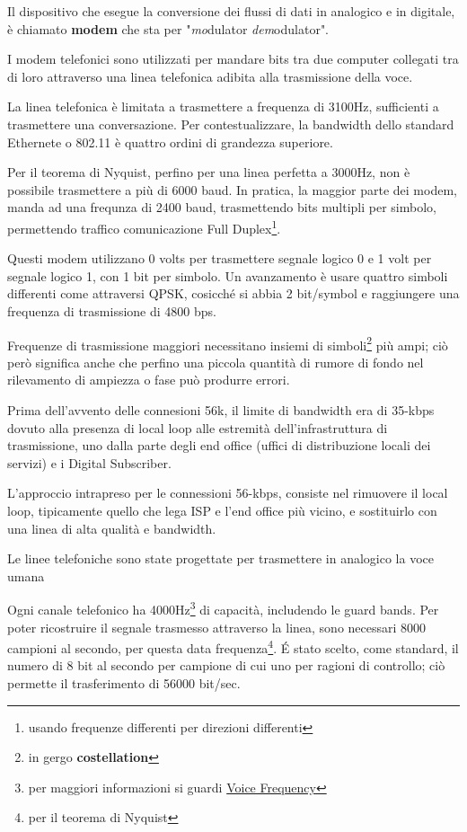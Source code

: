 \documentclass[../ComputerNetworks.tex]{subfiles}
\begin{document}
Il dispositivo che esegue la conversione dei flussi di dati in analogico e in digitale, è chiamato \textbf{modem} che sta per "\emph{mo}dulator \emph{dem}odulator".

I modem telefonici sono utilizzati per mandare bits tra due computer collegati tra di loro attraverso una linea telefonica adibita alla trasmissione della voce.

La linea telefonica è limitata a trasmettere a frequenza di 3100Hz, sufficienti a trasmettere una conversazione.
Per contestualizzare, la bandwidth dello standard Ethernete o 802.11 è quattro ordini di grandezza superiore.

Per il teorema di Nyquist, perfino per una linea perfetta a 3000Hz, non è possibile trasmettere a più di 6000 baud.
In pratica, la maggior parte dei modem, manda ad una frequnza di 2400 baud, trasmettendo bits multipli per simbolo, permettendo traffico comunicazione Full Duplex\footnote{usando frequenze differenti per direzioni differenti}.

Questi modem utilizzano 0 volts per trasmettere segnale logico 0 e 1 volt per segnale logico 1, con 1 bit per simbolo.
Un avanzamento è usare quattro simboli differenti come attraversi QPSK, cosicché si abbia 2 bit/symbol e raggiungere una frequenza di trasmissione di 4800 bps.

Frequenze di trasmissione maggiori necessitano insiemi di simboli\footnote{in gergo \textbf{costellation}} più ampi; ciò però significa anche che perfino una piccola quantità di rumore di fondo nel rilevamento di ampiezza o fase può produrre errori.

Prima dell'avvento delle connesioni 56k, il limite di bandwidth era di 35-kbps dovuto alla presenza di local loop alle estremità dell'infrastruttura di trasmissione, uno dalla parte degli end office (uffici di distribuzione locali dei servizi) e i Digital Subscriber.

L'approccio intrapreso per le connessioni 56-kbps, consiste nel rimuovere il local loop, tipicamente quello che lega ISP e l'end office più vicino, e sostituirlo con una linea di alta qualità e bandwidth.

Le linee telefoniche sono state progettate per trasmettere in analogico la voce umana

Ogni canale telefonico ha 4000Hz\footnote{per maggiori informazioni si guardi \href{https://en.wikipedia.org/wiki/Voice_frequency}{Voice Frequency}} di capacità, includendo le guard bands.
Per poter ricostruire il segnale trasmesso attraverso la linea, sono necessari 8000 campioni al secondo, per questa data frequenza\footnote{per il teorema di Nyquist}.
\'E stato scelto, come standard,  il numero di 8 bit al secondo per campione di cui uno per ragioni di controllo; ciò permette il trasferimento di 56000 bit/sec.
\end{document}
